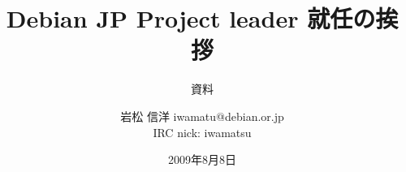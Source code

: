 




\documentclass[cjk,dvipdfmx,12pt]{beamer}
\usepackage{monthlypresentation}



\title{Debian JP Project leader 就任の挨拶}
\subtitle{資料}
\author{岩松 信洋 iwamatu@debian.or.jp\\IRC nick: iwamatsu}
\date{2009年8月8日}



